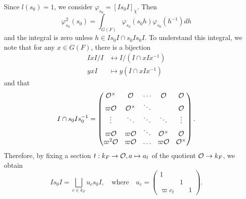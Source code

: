     Since $l(s_0)=1$, we consider $\varphi_{s_0}=[Is_0I]_{\check{\chi}}$. Then
    $$\varphi_{s_0}^2(s_0)=\int_{G(F)}\varphi_{s_0}(s_0h)\varphi_{s_0}(h^{-1})dh$$
    and the integral is zero unless $h\in Is_0I\cap s_0Is_0I$. To understand this integral, we note that for any $x\in G(F)$, there is a bijection
    \begin{align*}
        IxI/I&\longleftrightarrow I/(I\cap xIx^{-1})\\
        yxI&\longmapsto y(I\cap xIx^{-1})
    \end{align*}
    and that 
    \begin{equation*}
        I\cap s_0Is_0^{-1}=\begin{pmatrix}
            \mathcal{O}^\times & \mathcal{O} & \cdots & \mathcal{O} & \mathcal{O}\\
            \varpi\mathcal{O} & \mathcal{O}^\times & \ddots &  & \mathcal{O}\\
            \vdots &\ddots & \ddots & \ddots & \vdots \\
            \varpi\mathcal{O} & \varpi\mathcal{O} & \ddots & \mathcal{O}^\times & \mathcal{O}\\
            \varpi^2\mathcal{O} & \varpi\mathcal{O} & \ldots & \varpi\mathcal{O} & \mathcal{O}^\times
        \end{pmatrix}.
    \end{equation*}
    Therefore, by fixing a section $t:k_F\rightarrow\mathcal{O}, a\mapsto a_t$ of the quotient $\mathcal{O}\rightarrow k_F$, we obtain
    \begin{equation*}
        Is_0I=\bigsqcup_{c\in k_F} u_cs_0I,\quad\text{where}\quad u_c=
        \begin{pmatrix}
            1 & & \\
            & 1 & \\
            \varpi c_t & & 1
        \end{pmatrix}.
    \end{equation*}

